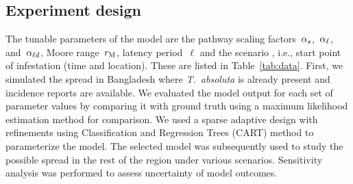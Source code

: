 \documentclass[11pt]{article}
\newcommand{\tuta}{\emph{T.~absoluta}}
\newcommand{\aacomment}[1]{({\color{magenta}AA: #1})}
\theoremstyle{definition}
\begin{document}
\begin{table}[t]
\begin{tabular}{l p{4cm} p{3cm} p{5cm}}
    \end{tabular}
\end{table}


\subsection{Experiment design}
\label{sec:expDesign}
The tunable parameters of the model are the pathway scaling
factors~$\alpha_s$,~$\alpha_{\ell}$, and~$\alpha_{\ell d}$, Moore range~$r_\mathrm{M}$, latency
period~$\ell$ and the scenario , i.e., start point of infestation (time and
location). These are listed in Table~\ref{tab:data}. First, we simulated
the spread in Bangladesh where \tuta{} is already present and incidence
reports are available. We evaluated the model output for each set of
parameter values by comparing it with ground truth using a maximum
likelihood estimation method for comparison. We used a sparse adaptive
design with refinements using Classification and Regression Trees (CART)
method to parameterize the model. The selected model was subsequently used to study
the possible spread in the rest of the region under various scenarios.
Sensitivity analysis was performed to assess uncertainty of model outcomes.
\end{document}
